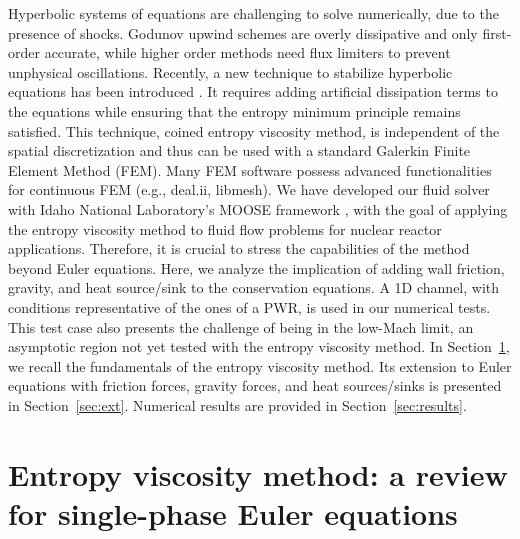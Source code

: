 \documentclass[12pt]{article}
\begin{document}
Hyperbolic systems of equations are challenging to solve numerically, due to the presence of shocks. Godunov upwind schemes are overly
dissipative and only first-order accurate, while higher order methods need flux  limiters to prevent unphysical oscillations. Recently,
a new technique to stabilize hyperbolic equations has been introduced \cite{valentin, jlg1, jlg2} . 
It requires adding artificial dissipation terms to the equations while ensuring that the entropy minimum principle remains satisfied. 
This technique, coined entropy viscosity method, is independent of the spatial discretization and thus can be used with a standard 
Galerkin Finite Element Method (FEM). Many FEM software possess advanced functionalities for continuous FEM (e.g., deal.ii, libmesh).
We have developed our fluid solver with Idaho National Laboratory's MOOSE framework \cite{Moose}, with the goal of applying the entropy 
viscosity method to fluid flow problems for nuclear reactor applications. Therefore, it is crucial to stress the capabilities of the method
beyond Euler equations. Here, we analyze the implication of adding wall friction, gravity, and heat source/sink to the conservation equations.
A 1D channel, with conditions representative of the ones of a PWR, is used in our numerical tests. This test case also presents the challenge
of being in the low-Mach limit, an asymptotic region not yet tested with the entropy viscosity method. In Section~\ref{sec:section1}, we recall
the fundamentals of the entropy viscosity method.  Its extension to Euler equations with friction forces, gravity forces, and heat sources/sinks is presented in Section~\ref{sec:ext}. Numerical results are provided in Section~\ref{sec:results}.


%
\section{Entropy viscosity method: a review for single-phase Euler equations}
\label{sec:section1}
\end{document}
